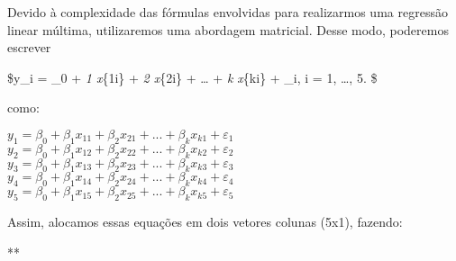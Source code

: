 \documentclass[
]{article}
\newenvironment{Shaded}{\begin{snugshade}}{\end{snugshade}}
\newcommand{\AttributeTok}[1]{\textcolor[rgb]{0.77,0.63,0.00}{#1}}
\newcommand{\ConstantTok}[1]{\textcolor[rgb]{0.00,0.00,0.00}{#1}}
\newcommand{\DecValTok}[1]{\textcolor[rgb]{0.00,0.00,0.81}{#1}}
\newcommand{\FunctionTok}[1]{\textcolor[rgb]{0.00,0.00,0.00}{#1}}
\newcommand{\NormalTok}[1]{#1}
\newcommand{\OtherTok}[1]{\textcolor[rgb]{0.56,0.35,0.01}{#1}}
\newcommand{\SpecialCharTok}[1]{\textcolor[rgb]{0.00,0.00,0.00}{#1}}
\begin{document}
Devido à complexidade das fórmulas envolvidas para realizarmos uma
regressão linear múltima, utilizaremos uma abordagem matricial. Desse
modo, poderemos escrever

\$y\_i = \beta\_0 + \beta\emph{1 x}\{1i\} + \beta\emph{2 x}\{2i\} +
\ldots{} + \beta\emph{k x}\{ki\} + \varepsilon\_i, i = 1, \ldots, 5. \$

como:

\(y_1 = \beta_0 + \beta_1 x_{11} + \beta_2 x_{21} + ... + \beta_k x_{k1} + \varepsilon_1\)
\(y_2 = \beta_0 + \beta_1 x_{12} + \beta_2 x_{22} + ... + \beta_k x_{k2} + \varepsilon_2\)
\(y_3 = \beta_0 + \beta_1 x_{13} + \beta_2 x_{23} + ... + \beta_k x_{k3} + \varepsilon_3\)
\(y_4 = \beta_0 + \beta_1 x_{14} + \beta_2 x_{24} + ... + \beta_k x_{k4} + \varepsilon_4\)
\(y_5 = \beta_0 + \beta_1 x_{15} + \beta_2 x_{25} + ... + \beta_k x_{k5} + \varepsilon_5\)

Assim, alocamos essas equações em dois vetores colunas (5x1), fazendo:

\begin{Shaded}
\end{Shaded}

**
\end{document}
